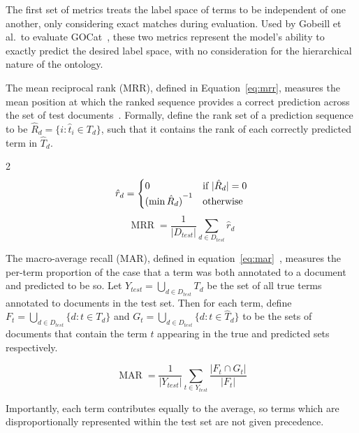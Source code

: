 \documentclass[11pt]{article}
\theoremstyle{plain}
\theoremstyle{definition}
\begin{document}
The first set of metrics treats the label space of terms to be independent of one another, only considering exact matches during evaluation. Used by Gobeill et al.\ to evaluate GOCat~\cite{gobeill/2013/managing}, these two metrics represent the model's ability to exactly predict the desired label space, with no consideration for the hierarchical nature of the ontology.

The mean reciprocal rank (MRR), defined in Equation~\ref{eq:mrr}, measures the mean position at which the ranked sequence provides a correct prediction across the set of test documents~\cite{radev/2002/evaluating}. Formally, define the rank set of a prediction sequence to be $\hat{R}_d = \{  i : \hat{t}_i \in T_d \}$, such that it contains the rank of each correctly predicted term in $\hat{T}_d$.

\begin{multicols}{2}
    \begin{equation}\label{eq:rr}
        \hat{r}_d =
        \begin{cases}
            0                      & \textnormal{if } |\hat{R}_d| = 0 \\
            {(\min\hat{R}_d)}^{-1} & \textnormal{otherwise}
        \end{cases}
    \end{equation}
    \break{}
    \begin{equation}\label{eq:mrr}
        \operatorname{MRR} = \frac{1}{|D_{test}|} \sum_{d \in D_{test}} \hat{r}_d
    \end{equation}
\end{multicols}

The macro-average recall (MAR), defined in equation~\ref{eq:mar}~\cite{sokolova/2009/systematic}, measures the per-term proportion of the case that a term was both annotated to a document and predicted to be so. Let $Y_{test} = \bigcup_{d \in D_{test}} T_d$ be the set of all true terms annotated to documents in the test set. Then for each term, define $F_t = \bigcup_{d \in D_{test}} \{d : t \in T_d\}$ and $G_t = \bigcup_{d \in D_{test}} \{d : t \in \hat{T}_d\}$ to be the sets of documents that contain the term $t$ appearing in the true and predicted sets respectively.

\begin{equation}
    \operatorname{MAR} = \frac{1}{|Y_{test}|} \sum_{t \in Y_{test}} \frac{|F_t \cap G_t|}{|F_t|}
    \label{eq:mar}
\end{equation}

Importantly, each term contributes equally to the average, so terms which are disproportionally represented within the test set are not given precedence.
\end{document}
